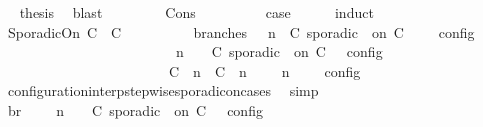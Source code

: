 \begin{isabellebody}
\ \isamarkupfalse%
\ {\isacharquery}thesis\ \isamarkupfalse%
\ blast\isanewline
\ \ \ \ \isamarkupfalse%
\isanewline
{}\isamarkupfalse%
\isanewline
\ \ \isamarkupfalse%
\ {\isacharparenleft}Cons\ {\isasympsi}\ {\isasymPsi}{\isacharparenright}\isanewline
\ \ \ \ \isamarkupfalse%
\ \isamarkupfalse%
\ {\isacharquery}case\isanewline
\ \ \ \ \isamarkupfalse%
\ {\isacharparenleft}induct\ {\isasympsi}{\isacharparenright}\isanewline
\ \ \ \ \ \ \isamarkupfalse%
\ {\isacharparenleft}SporadicOn\ C\ {\isasymtau}\ C\isanewline
\ \ \ \ \ \ \ \ \isamarkupfalse%
\ branches{\isacharcolon}\ {\isacartoucheopen}{\isasymlbrakk}\ {\isasymGamma}{\isacharcomma}\ n\ {\isasymturnstile}\ {\isacharparenleft}{\isacharparenleft}C\ sporadic\ {\isasymtau}\ on\ C\ {\isacharhash}\ {\isasymPsi}{\isacharparenright}\ {\isasymtriangleright}\ {\isasymPhi}\ {\isasymrbrakk}\isactrlsub c\isactrlsub o\isactrlsub n\isactrlsub f\isactrlsub i\isactrlsub g\isanewline
\ \ \ \ \ \ \ \ \ \ \ \ \ \ \ \ \ \ \ \ \ \ {\isacharequal}\ {\isasymlbrakk}\ {\isasymGamma}{\isacharcomma}\ n\ {\isasymturnstile}\ {\isasymPsi}\ {\isasymtriangleright}\ {\isacharparenleft}{\isacharparenleft}C\ sporadic\ {\isasymtau}\ on\ C\ {\isacharhash}\ {\isasymPhi}{\isacharparenright}\ {\isasymrbrakk}\isactrlsub c\isactrlsub o\isactrlsub n\isactrlsub f\isactrlsub i\isactrlsub g\isanewline
\ \ \ \ \ \ \ \ \ \ \ \ \ \ \ \ \ \ \ \ \ \ {\isasymunion}\ {\isasymlbrakk}\ {\isacharparenleft}{\isacharparenleft}C\ {\isasymUp}\ n{\isacharparenright}\ {\isacharhash}\ {\isacharparenleft}C\ {\isasymDown}\ n\ {\isacharat}\ {\isasymtau}{\isacharparenright}\ {\isacharhash}\ {\isasymGamma}{\isacharparenright}{\isacharcomma}\ n\ {\isasymturnstile}\ {\isasymPsi}\ {\isasymtriangleright}\ {\isasymPhi}\ {\isasymrbrakk}\isactrlsub c\isactrlsub o\isactrlsub n\isactrlsub f\isactrlsub i\isactrlsub g{\isacartoucheclose}\isanewline
\ \ \ \ \ \ \ \ \ \ \isamarkupfalse%
\ configuration{\isacharunderscore}interp{\isacharunderscore}stepwise{\isacharunderscore}sporadicon{\isacharunderscore}cases\ \isamarkupfalse%
\ simp\isanewline
\ \ \ \ \ \ \ \ \isamarkupfalse%
\ br{}{\isacharcolon}\ {\isacartoucheopen}{\isasymrho}\ {\isasymin}\ {\isasymlbrakk}\ {\isasymGamma}{\isacharcomma}\ n\ {\isasymturnstile}\ {\isasymPsi}\ {\isasymtriangleright}\ {\isacharparenleft}{\isacharparenleft}C\ sporadic\ {\isasymtau}\ on\ C\ {\isacharhash}\ {\isasymPhi}{\isacharparenright}\ {\isasymrbrakk}\isactrlsub c\isactrlsub o\isactrlsub n\isactrlsub f\isactrlsub i\isactrlsub g\isanewline

\end{isabellebody}
